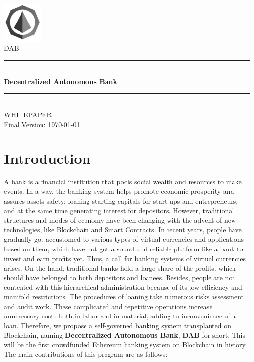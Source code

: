 \documentclass[review]{elsarticle}
\newcommand{\HRule}{\rule{\linewidth}{0.5mm}}
\begin{document}
\begin{titlepage}
\begin{center}

\includegraphics[width=0.15\textwidth]{Graphs/logo3.jpg}\\[0.6cm]    
\textsc{\huge DAB}\\[1cm]

\HRule \\[0.75cm]
{ \huge \bfseries Decentralized Autonomous Bank}\\[0.4cm]
\HRule \\[1.5cm]
\textsc{\LARGE WHITEPAPER}\\[0.5cm]

\vfill
{\large Final Version: \today}

\end{center}
\end{titlepage}

\section{Introduction}
A bank is a financial institution that pools social wealth and resources to make events. In a way, the banking system helps promote economic prosperity and assures assets safety: loaning starting capitals for start-ups and entrepreneurs, and at the same time generating interest for depositors. However, traditional structures and modes of economy have been changing with the advent of new technologies, like Blockchain and Smart Contracts. In recent years, people have gradually got accustomed to various types of virtual currencies and applications based on them, which have not got a sound and reliable platform like a bank to invest and earn profits yet. Thus, a call for banking systems of virtual currencies arises.
On the hand, traditional banks hold a large share of the profits, which should have belonged to both depositors and loanees. Besides, people are not contented with this hierarchical administration because of its low efficiency and manifold restrictions. The procedures of loaning take numerous risks assessment and audit work. These complicated and repetitive operations increase unnecessary costs both in labor and in material, adding to inconvenience of a loan.
Therefore, we propose a self-governed banking system transplanted on Blockchain, naming \textbf{Decentralized Autonomous Bank}, \textbf{DAB} for short. 
This will be \underline{the first} crowdfunded Ethereum banking system on Blockchain in history. The main contributions of this program are as follows:
\end{document}
